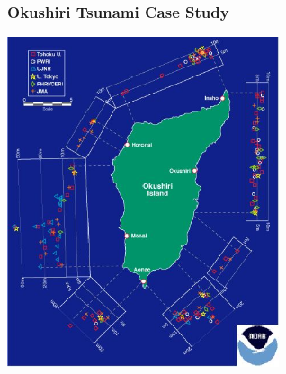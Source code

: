 \documentclass[11pt,ucs]{beamer}
\begin{document}
\begin{frame}\frametitle{Okushiri Tsunami Case Study}


\begin{center}

\includegraphics[width=0.6\textwidth]{okushiri-wave-heights.jpg}

\end{center}

\end{frame}
\end{document}
